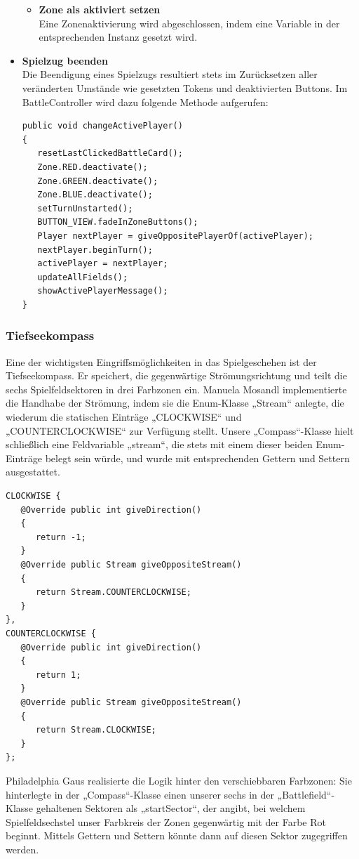 \begin{itemize}
\begin{itemize}
\item \textbf{Zone als aktiviert setzen} \\
Eine Zonenaktivierung wird abgeschlossen, indem eine Variable in der entsprechenden Instanz gesetzt wird.
\end{itemize}
\item \textbf{Spielzug beenden} \\
Die Beendigung eines Spielzugs resultiert stets im Zurücksetzen aller veränderten Umstände wie gesetzten Tokens und deaktivierten Buttons. Im BattleController wird dazu folgende Methode aufgerufen:
\begin{lstlisting}
public void changeActivePlayer()
{
   resetLastClickedBattleCard();
   Zone.RED.deactivate();
   Zone.GREEN.deactivate();
   Zone.BLUE.deactivate();
   setTurnUnstarted();
   BUTTON_VIEW.fadeInZoneButtons();
   Player nextPlayer = giveOppositePlayerOf(activePlayer);
   nextPlayer.beginTurn();
   activePlayer = nextPlayer;
   updateAllFields();
   showActivePlayerMessage();
}

\end{lstlisting}
\end{itemize}

\subsubsection{Tiefseekompass}
Eine der wichtigsten Eingriffsmöglichkeiten in das Spielgeschehen ist der Tiefseekompass. Er speichert, die gegenwärtige Strömungsrichtung und teilt die sechs Spielfeldsektoren in drei Farbzonen ein.
Manuela Mosandl implementierte die Handhabe der Strömung, indem sie die Enum-Klasse „Stream“ anlegte, die wiederum die statischen Einträge „CLOCKWISE“ und „COUNTERCLOCKWISE“ zur Verfügung stellt. Unsere „Compass“-Klasse hielt schließlich eine Feldvariable „stream“, die stets mit einem dieser beiden Enum-Einträge belegt sein würde, und wurde mit entsprechenden Gettern und Settern ausgestattet.
\begin{lstlisting}
CLOCKWISE {
   @Override public int giveDirection()
   {
      return -1;
   }
   @Override public Stream giveOppositeStream()
   {
      return Stream.COUNTERCLOCKWISE;
   }
},
COUNTERCLOCKWISE {
   @Override public int giveDirection()
   {
      return 1;
   }
   @Override public Stream giveOppositeStream()
   {
      return Stream.CLOCKWISE;
   }
};
\end{lstlisting}

Philadelphia Gaus realisierte die Logik hinter den verschiebbaren Farbzonen: Sie hinterlegte in der „Compass“-Klasse einen unserer sechs in der „Battlefield“-Klasse gehaltenen Sektoren als „startSector“, der angibt, bei welchem Spielfeldsechstel unser Farbkreis der Zonen gegenwärtig mit der Farbe Rot beginnt. Mittels Gettern und Settern könnte dann auf diesen Sektor zugegriffen werden.

